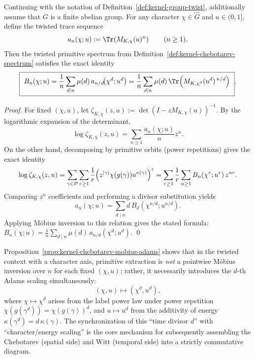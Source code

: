 \begin{proposition}\label{prop:kernel-chebotarev-mobius-adams}
Continuing with the notation of Definition~\ref{def:kernel-group-twist}, additionally assume that \(G\) is a finite abelian group.
For any character \(\chi\in\widehat G\) and \(u\in(0,1]\), define the twisted trace sequence
\[
a_n(\chi;u):=\Tr\!\left(M_{K,\chi}(u)^n\right)\qquad(n\ge 1).
\]
Then the twisted primitive spectrum from Definition~\ref{def:kernel-chebotarev-spectrum} satisfies the exact identity
\[
\boxed{\
B_n(\chi;u)=\frac{1}{n}\sum_{d\mid n}\mu(d)\,a_{n/d}\!\bigl(\chi^{d};u^{d}\bigr)
=\frac{1}{n}\sum_{d\mid n}\mu(d)\,\Tr\!\left(M_{K,\chi^{d}}(u^{d})^{\,n/d}\right)\ }.
\]
\end{proposition}
\begin{proof}
For fixed \((\chi,u)\), let
\(
\zeta_{K,\chi}(z,u):=\det(I-zM_{K,\chi}(u))^{-1}
\).
By the logarithmic expansion of the determinant,
\[
\log\zeta_{K,\chi}(z,u)
=\sum_{n\ge 1}\frac{a_n(\chi;u)}{n}z^n.
\]
On the other hand, decomposing by primitive orbits (power repetitions) gives the exact identity
\[
\log\zeta_{K,\chi}(z,u)
=\sum_{\gamma\in\mathcal{P}}\sum_{r\ge 1}\frac{1}{r}\Bigl(z^{|\gamma|}\chi(g(\gamma))u^{\kappa(\gamma)}\Bigr)^r
=\sum_{r\ge 1}\frac{1}{r}\sum_{n\ge 1}B_n(\chi^r;u^r)\,z^{nr}.
\]
Comparing $z^n$ coefficients and performing a divisor substitution yields
\[
a_n(\chi;u)=\sum_{d\mid n} d\,B_d(\chi^{n/d};u^{n/d}).
\]
Applying M\"obius inversion to this relation gives the stated formula:
\(
B_n(\chi;u)=\frac{1}{n}\sum_{d\mid n}\mu(d)\,a_{n/d}(\chi^d;u^d)
\). \qed
\end{proof}

\begin{remark}\label{rem:kernel-chebotarev-mobius-adams-meaning}
Proposition~\ref{prop:kernel-chebotarev-mobius-adams} shows that in the twisted context with a character axis, primitive extraction is \emph{not} a pointwise M\"obius inversion over \(n\) for each fixed \((\chi,u)\);
rather, it necessarily introduces the \(d\)-th Adams scaling simultaneously:
\[
(\chi,u)\longmapsto(\chi^d,u^d),
\]
where \(\chi\mapsto\chi^d\) arises from the label power law under power repetition \(\chi(g(\gamma^d))=\chi(g(\gamma))^d\), and \(u\mapsto u^d\) from the additivity of energy \(\kappa(\gamma^d)=d\,\kappa(\gamma)\).
The synchronization of this ``time divisor \(d\)'' with ``character/energy scaling'' is the core mechanism for subsequently assembling the Chebotarev (spatial side) and Witt (temporal side) into a strictly commutative diagram.
\end{remark}


